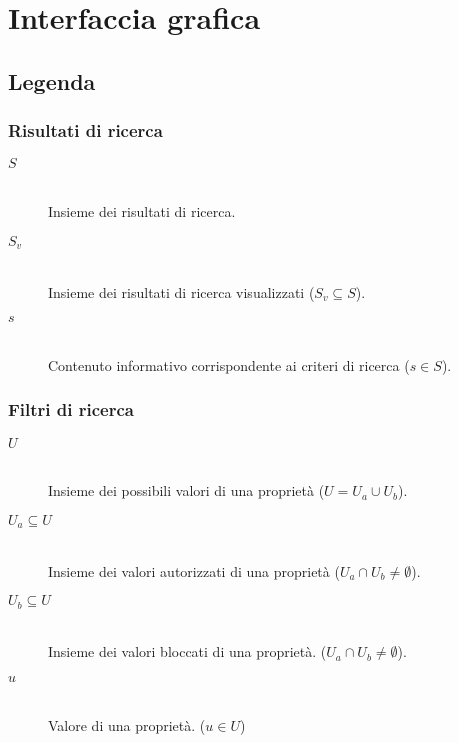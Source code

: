 \chapter{Interfaccia grafica}
\label{ch:appendice:interfaccia-grafica}

\section*{Legenda}

\subsection*{Risultati di ricerca}
\begin{description}
	\item[$S$] \hfill \\
	Insieme dei risultati di ricerca.
	\item[$S_v$] \hfill \\
	Insieme dei risultati di ricerca visualizzati ($S_v \subseteq S$).
	\item[$s$] \hfill \\
	Contenuto informativo corrispondente ai criteri di ricerca ($s \in S$).
\end{description}

\subsection*{Filtri di ricerca}
\begin{description}
	\item[$U$] \hfill \\
	Insieme dei possibili valori di una proprietà ($U = U_a \cup U_b$).
	\item[$U_a \subseteq U$] \hfill \\
	Insieme dei valori autorizzati di una proprietà ($U_a \cap U_b \neq \emptyset$).
	\item[$U_b \subseteq U$] \hfill \\
	Insieme dei valori bloccati di una proprietà. ($U_a \cap U_b \neq \emptyset$).
	\item[$u$] \hfill \\
	Valore di una proprietà. ($u \in U$)
\end{description}

